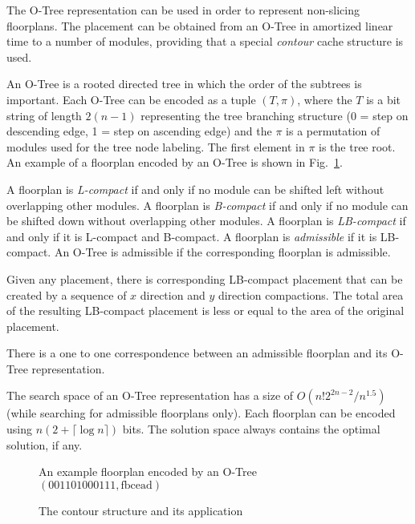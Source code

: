 The O-Tree representation \cite{otree} can be used in order to represent non-slicing floorplans. The placement can be obtained from an O-Tree in amortized linear time to a number of modules, providing that a special {\em contour} cache structure is used.

An O-Tree is a rooted directed tree in which the order of the subtrees is important. Each O-Tree can be encoded as a tuple $(T, \pi)$, where the $T$ is a bit string of length $2(n-1)$ representing the tree branching structure (0 = step on descending edge, 1 = step on ascending edge) and the $\pi$ is a permutation of modules used for the tree node labeling. The first element in $\pi$ is the tree root. An example of a floorplan encoded by an O-Tree is shown in Fig.~\ref{fig:otree}.

A floorplan is {\em L-compact} if and only if no module can be shifted left without overlapping other modules. A floorplan is {\em B-compact} if and only if no module can be shifted down without overlapping other modules. A floorplan is {\em LB-compact} if and only if it is L-compact and B-compact. A floorplan is {\em admissible} if it is LB-compact. An O-Tree is admissible if the corresponding floorplan is admissible.

Given any placement, there is corresponding LB-compact placement that can be created by a sequence of $x$ direction and $y$ direction compactions. The total area of the resulting LB-compact placement is less or equal to the area of the original placement.  

There is a one to one correspondence between an admissible floorplan and its O-Tree representation.

The search space of an O-Tree representation \cite{otree} has a size of $O(n!2^{2n-2}/n^{1.5})$ (while searching for admissible floorplans only). Each floorplan can be encoded using $n(2+\lceil\log n\rceil)$ bits. The solution space always contains the optimal solution, if any.

\begin{figure}
\centering
{} \hfill
{}
\caption{An example floorplan encoded by an O-Tree $(\mathrm{001101000111}, \mathrm{fbcead})$}
\label{fig:otree}
\end{figure}

\begin{figure}
\centering
{} \hfill
{}
\caption{The contour structure and its application}
\label{fig:contour}
\end{figure}

